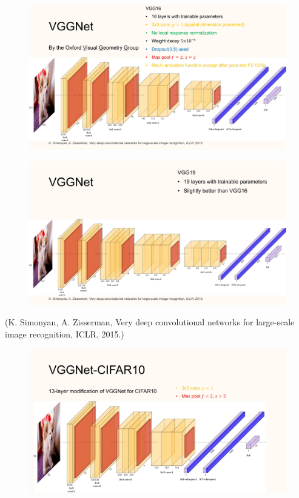 \documentclass{report}
\begin{document}
\begin{definition}[7.8][VGGNet]
    \begin{figure}[H]
        \centering
        \includegraphics[width=1.0\textwidth]{.././assets/7.7.jpg}
    \end{figure}

    \begin{figure}[H]
        \centering
        \includegraphics[width=1.0\textwidth]{.././assets/7.8.jpg}
    \end{figure}

    (K. Simonyan, A. Zisserman, Very deep convolutional networks for large-scale image recognition, ICLR, 2015.)
\end{definition}

\begin{definition}
    \begin{figure}[H]
        \centering
        \includegraphics[width=1.0\textwidth]{.././assets/7.9.jpg}
    \end{figure}
\end{definition}
\end{document}
